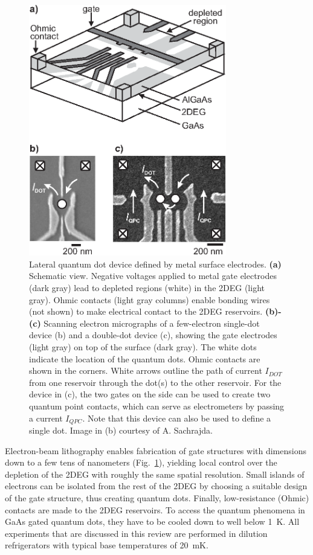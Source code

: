 \documentclass[12pt,aps,nofootinbib]{revtex4-1}
\begin{document}
\begin{figure}[htb]
\includegraphics[width=3.4in, clip=true]{hanson_fig02.eps}
\caption{Lateral quantum dot device defined by metal surface
electrodes. \textbf{(a)} Schematic view. Negative voltages applied
to metal gate electrodes (dark gray) lead to depleted regions
(white) in the 2DEG (light gray). Ohmic contacts (light gray
columns) enable bonding wires (not shown) to make electrical
contact to the 2DEG reservoirs. \textbf{(b)-(c)} Scanning electron
micrographs of a few-electron single-dot device (b) and a
double-dot device (c), showing the gate electrodes (light gray) on
top of the surface (dark gray). The white dots indicate the
location of the quantum dots. Ohmic contacts are shown in the
corners. White arrows outline the path of current $I_{DOT}$ from
one reservoir through the dot(s) to the other reservoir. For the
device in (c), the two gates on the side can be used to create two
quantum point contacts, which can serve as electrometers by
passing a current $I_{QPC}$. Note that this device can also be
used to define a single dot. Image in (b) courtesy of A.
Sachrajda.} \label{fig:structure}
\end{figure}

Electron-beam lithography enables fabrication of gate structures
with dimensions down to a few tens of nanometers
(Fig.~\ref{fig:structure}), yielding local control over the
depletion of the 2DEG with roughly the same spatial resolution.
Small islands of electrons can be isolated from the rest of the
2DEG by choosing a suitable design of the gate structure, thus
creating quantum dots. Finally, low-resistance (Ohmic) contacts
are made to the 2DEG reservoirs. To access the quantum phenomena
in GaAs gated quantum dots, they have to be cooled down to well
below 1~K. All experiments that are discussed in this review are
performed in dilution refrigerators with typical base temperatures
of 20~mK.
\end{document}
